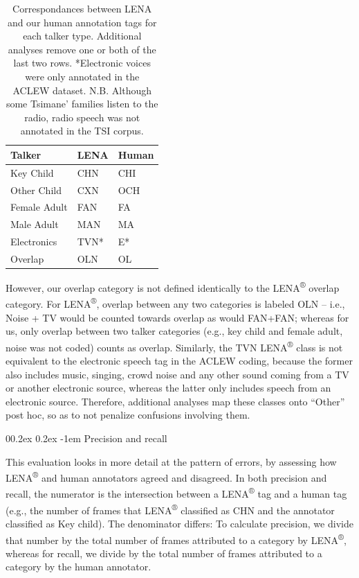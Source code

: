 \documentclass[english,table,man,floatsintext]{apa6}
\makeatletter
\let\oldparagraph\paragraph
\renewcommand{\paragraph}[1]{\oldparagraph{#1}\mbox{}}
\renewcommand{\paragraph}{\@startsection{paragraph}{4}{\parindent}%
  {0\baselineskip \@plus 0.2ex \@minus 0.2ex}%
  {-1em}%
  {\normalfont\normalsize\bfseries\itshape\typesectitle}}
\makeatother
\begin{document}
\begin{table}

\caption{\label{tab:tab-tsicor}Correspondances between LENA and our human annotation tags for each talker type. Additional analyses remove one or both of the last two rows. *Electronic voices were only annotated in the ACLEW dataset. N.B. Although some Tsimane' families listen to the radio, radio speech was not annotated in the TSI corpus.}
\centering
\begin{tabular}[t]{>{\raggedright\arraybackslash}p{4cm}>{\raggedright\arraybackslash}p{2cm}>{\raggedright\arraybackslash}p{2cm}}
\toprule
Talker & LENA & Human\\
\midrule
Key Child & CHN & CHI\\
Other Child & CXN & OCH\\
Female Adult & FAN & FA\\
Male Adult & MAN & MA\\
Electronics & TVN* & E*\\
\addlinespace
Overlap & OLN & OL\\
\bottomrule
\end{tabular}
\end{table}

However, our overlap category is not defined identically to the LENA\textsuperscript{®} overlap category. For LENA\textsuperscript{®}, overlap between any two categories is labeled OLN -- i.e., Noise + TV would be counted towards overlap as would FAN+FAN; whereas for us, only overlap between two talker categories (e.g., key child and female adult, noise was not coded) counts as overlap. Similarly, the TVN LENA\textsuperscript{®} class is not equivalent to the electronic speech tag in the ACLEW coding, because the former also includes music, singing, crowd noise and any other sound coming from a TV or another electronic source, whereas the latter only includes speech from an electronic source. Therefore, additional analyses map these classes onto \enquote{Other} post hoc, so as to not penalize confusions involving them.

\hypertarget{precision-and-recall}{%
\paragraph{Precision and recall}\label{precision-and-recall}}

This evaluation looks in more detail at the pattern of errors, by assessing how LENA\textsuperscript{®} and human annotators agreed and disagreed. In both precision and recall, the numerator is the intersection between a LENA\textsuperscript{®} tag and a human tag (e.g., the number of frames that LENA\textsuperscript{®} classified as CHN and the annotator classified as Key child). The denominator differs: To calculate precision, we divide that number by the total number of frames attributed to a category by LENA\textsuperscript{®}, whereas for recall, we divide by the total number of frames attributed to a category by the human annotator.
\end{document}
